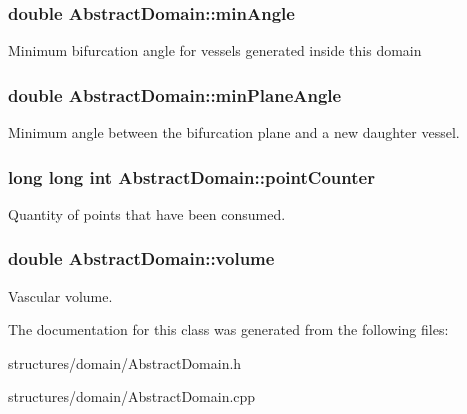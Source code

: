 \subsubsection[{\texorpdfstring{min\+Angle}{minAngle}}]{\setlength{\rightskip}{0pt plus 5cm}double Abstract\+Domain\+::min\+Angle\hspace{0.3cm}{\ttfamily [protected]}}\hypertarget{class_abstract_domain_afa74f9bbc9eb00511fa714ece659e24c}{}\label{class_abstract_domain_afa74f9bbc9eb00511fa714ece659e24c}
Minimum bifurcation angle for vessels generated inside this domain 
\subsubsection[{\texorpdfstring{min\+Plane\+Angle}{minPlaneAngle}}]{\setlength{\rightskip}{0pt plus 5cm}double Abstract\+Domain\+::min\+Plane\+Angle\hspace{0.3cm}{\ttfamily [protected]}}\hypertarget{class_abstract_domain_abf41d751c56a23ba910dd8860d302872}{}\label{class_abstract_domain_abf41d751c56a23ba910dd8860d302872}
Minimum angle between the bifurcation plane and a new daughter vessel. 
\subsubsection[{\texorpdfstring{point\+Counter}{pointCounter}}]{\setlength{\rightskip}{0pt plus 5cm}long long int Abstract\+Domain\+::point\+Counter\hspace{0.3cm}{\ttfamily [protected]}}\hypertarget{class_abstract_domain_af6ca325d56ec51a792d2c0c049e424b0}{}\label{class_abstract_domain_af6ca325d56ec51a792d2c0c049e424b0}
Quantity of points that have been consumed. 
\subsubsection[{\texorpdfstring{volume}{volume}}]{\setlength{\rightskip}{0pt plus 5cm}double Abstract\+Domain\+::volume\hspace{0.3cm}{\ttfamily [protected]}}\hypertarget{class_abstract_domain_a1cd2c4a6df09d717a7c77c82066f8060}{}\label{class_abstract_domain_a1cd2c4a6df09d717a7c77c82066f8060}
Vascular volume. 

The documentation for this class was generated from the following files\+:\begin{DoxyCompactItemize}
\item 
structures/domain/Abstract\+Domain.\+h\item 
structures/domain/Abstract\+Domain.\+cpp\end{DoxyCompactItemize}
